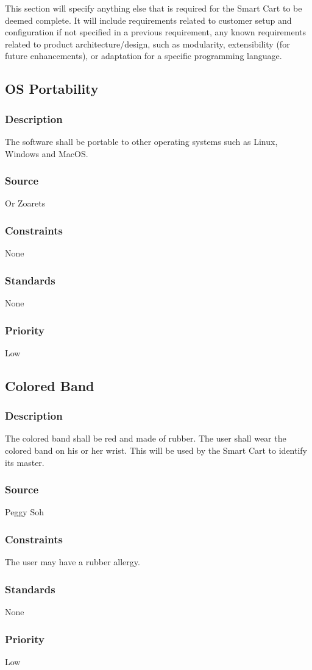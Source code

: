This section will specify anything else that is required for the Smart Cart to be deemed complete. It will include requirements related to customer setup and configuration if not specified in a previous requirement, any known requirements related to product architecture/design, such as modularity, extensibility (for future enhancements), or adaptation for a specific programming language.

\subsection{OS Portability}
\subsubsection{Description}
The software shall be portable to other operating systems such as Linux, Windows and MacOS. 
\subsubsection{Source}
Or Zoarets
\subsubsection{Constraints}
None
\subsubsection{Standards}
None
\subsubsection{Priority}
Low

\subsection{Colored Band}
\subsubsection{Description}
The colored band shall be red and made of rubber. The user shall wear the colored band on his or her wrist. This will be used by the Smart Cart to identify its master. 
\subsubsection{Source}
Peggy Soh
\subsubsection{Constraints}
The user may have a rubber allergy.
\subsubsection{Standards}
None
\subsubsection{Priority}
Low

